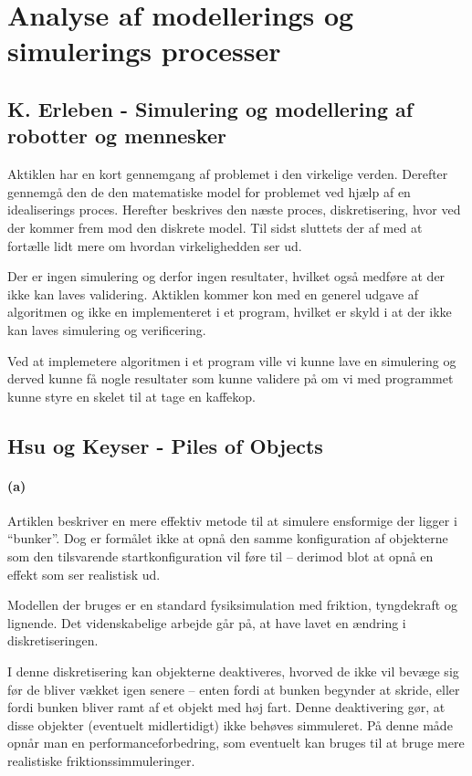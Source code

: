 \section{Analyse af modellerings og simulerings processer}

\subsection{K. Erleben - Simulering og modellering af robotter og mennesker}
Aktiklen har en kort gennemgang af problemet i den virkelige verden. Derefter
gennemgå den de den matematiske model for problemet ved hjælp af en
idealiserings proces. Herefter beskrives den næste proces, diskretisering, hvor
ved der kommer frem mod den diskrete model. Til sidst sluttets der af med at
fortælle lidt mere om hvordan virkelighedden ser ud.

Der er ingen simulering og derfor ingen resultater, hvilket også medføre at
der ikke kan laves validering. Aktiklen kommer kon med en generel udgave af
algoritmen og ikke en implementeret i et program, hvilket er skyld i at der
ikke kan laves simulering og verificering.


Ved at implemetere algoritmen i et program ville vi kunne lave en simulering og
derved kunne få nogle resultater som kunne validere på om vi med programmet
kunne styre en skelet til at tage en kaffekop.

\subsection{Hsu og Keyser - Piles of Objects}
\paragraph{(a)}
Artiklen beskriver en mere effektiv metode til at simulere ensformige der ligger
i ``bunker''. Dog er formålet ikke at opnå den samme konfiguration af objekterne
som den tilsvarende startkonfiguration vil føre til -- derimod blot at opnå en
effekt som ser realistisk ud.

Modellen der bruges er en standard fysiksimulation med friktion, tyngdekraft og
lignende. Det videnskabelige arbejde går på, at have lavet en ændring i
diskretiseringen.

I denne diskretisering kan objekterne deaktiveres, hvorved de
ikke vil bevæge sig før de bliver vækket igen senere -- enten fordi at bunken
begynder at skride, eller fordi bunken bliver ramt af et objekt med høj fart.
Denne deaktivering gør, at disse objekter (eventuelt midlertidigt) ikke behøves
simmuleret. På denne måde opnår man en performanceforbedring, som eventuelt kan
bruges til at bruge mere realistiske friktionssimmuleringer.


